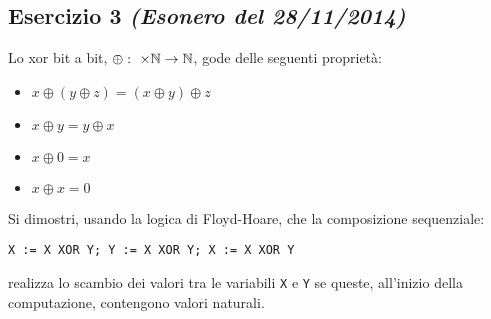 \subsection{Esercizio 3 \emph{(Esonero del 28/11/2014)}}
Lo xor bit a bit, $ \oplus: \ \times \mathbb{N} \rightarrow \mathbb{N} $, gode delle
seguenti proprietà:
\begin{itemize}
        \item $ x \oplus (y \oplus z) = (x \oplus y) \oplus z $ 
        \item $ x \oplus y = y \oplus x $ 
        \item $ x \oplus 0 = x $ 
        \item $ x \oplus x = 0 $ 
\end{itemize}
Si dimostri, usando la logica di Floyd-Hoare, che la composizione sequenziale:
\begin{center}
\texttt{X := X XOR Y; Y := X XOR Y; X := X XOR Y}
\end{center}
realizza lo scambio dei valori tra le variabili \texttt{X} e \texttt{Y} se queste, all'inizio della computazione, contengono valori naturali.

